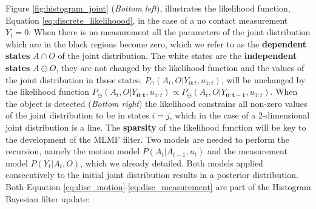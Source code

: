 Figure \ref{fig:histogram_joint} (\textit{Bottom left}), illustrates the likelihood function, Equation \ref{eq:discrete_likelihoood}, 
in the case of a no contact measurement $Y_t=0$. When there is no measurement all the parameters of the 
joint distribution which are in the black regions become zero, which we refer to as the \textbf{dependent states} $A \cap O$ of the joint 
distribution. The white states are the \textbf{independent states} $A \ominus O$, they are not changed by the likelihood function 
and the values of the joint distribution in those states, $P_{\cap}(A_t,O|Y_{0:t},u_{1:t})$, will be unchanged by the likelihood function
$P_{\ominus}(A_t,O|Y_{\mathbf{0:t}},u_{1:t}) \propto P_{\ominus}(A_t,O|Y_ {\mathbf{0:t-1}},u_{1:t})$. 
When the object is detected (\textit{Bottom right}) the likelihood constrains all non-zero values of the joint 
distribution to be in states $i = j$, which in the case of a 2-dimensional joint 
distribution is a line. The \textbf{sparsity} of the likelihood function  will be key to the development of the MLMF filter.
Two models are needed to perform the recursion, namely the motion model $P(A_t|A_{t-1},u_t)$ and the measurement model
$P(Y_t|A_t,O)$, which we already detailed. Both models applied consecutively to the initial joint distribution results in a posterior
distribution. Both Equation \ref{eq:disc_motion}-\ref{eq:disc_measurement} are part of the Histogram Bayesian filter 
update:
\begin{center}
%
\end{center}

